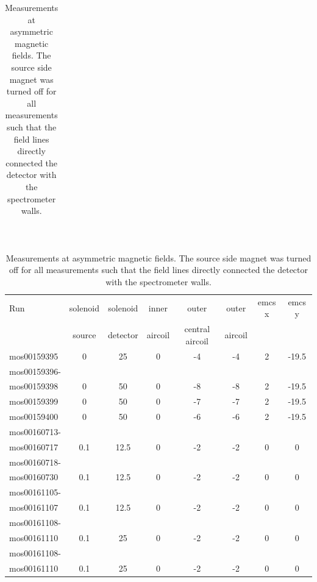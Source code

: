   \begin{table}[b!]
	\centering
		\begin{tabular}{c}
		\end{tabular}\\
		\begin{tabular}{|l|ccccccc|}
			\hline
			\centering
			
			Run &  solenoid &solenoid &inner & outer &outer &emcs x	&emcs y\\
			& source	& detector & aircoil & central aircoil & aircoil& &\\
			\hline
			mos00159395& 0&	25&	0&	-4&	-4&	2&	-19.5\\
			\hline
			mos00159396-&&&&&&&\\
			mos00159398 & 0 & 50& 0 & -8 & -8 & 2 & -19.5\\
			\hline
			mos00159399 & 0 & 50& 0 & -7 & -7 & 2 & -19.5\\
			\hline
			mos00159400 & 0 & 50& 0 & -6 & -6 & 2 & -19.5\\
			\hline
			mos00160713-&&&&&&&\\
			mos00160717& 0.1 & 12.5 & 0 & -2 & -2 & 0 & 0\\
			\hline
			mos00160718-&&&&&&&\\
			mos00160730 & 0.1 & 12.5 & 0 & -2 & -2 & 0 & 0\\
			\hline
			mos00161105-&&&&&&&\\
			mos00161107 & 0.1 & 12.5 & 0 & -2 & -2 & 0 & 0\\
			\hline
			mos00161108-&&&&&&&\\
			mos00161110 & 0.1 & 25 & 0 & -2 & -2 & 0 & 0\\
			\hline
			mos00161108-&&&&&&&\\
			mos00161110 & 0.1 & 25 & 0 & -2 & -2 & 0 & 0\\
			\hline
		\end{tabular}
		\caption[Asymmetric Magnetic Field Measurements]{Measurements at asymmetric magnetic fields. The source side magnet was turned off for all measurements such that the field lines directly connected the detector with the spectrometer walls.}
		\label{tab:analysis:asymmetricMagneticFields}
	\end{table}
	
